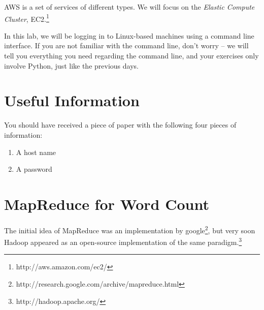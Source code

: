 AWS is a set of services of different types. We will focus on the \emph{Elastic
Compute Cluster}, EC2.\footnote{http://aws.amazon.com/ec2/}

In this lab, we will be logging in to Linux-based machines using a command line
interface. If you are not familiar with the command line, don't worry -- we
will tell you everything you need regarding the command line, and your
exercises only involve Python, just like the previous days.

\section{Useful Information}

You should have received a piece of paper with the following four pieces of
information:

\begin{enumerate}
\item A host name
\item A password
\end{enumerate}

%
%
%
%

\section{MapReduce for Word Count}

The initial idea of MapReduce was an implementation by
google\footnote{http://research.google.com/archive/mapreduce.html}, but very
soon Hadoop appeared as an open-source implementation of the same
paradigm.\footnote{http://hadoop.apache.org/}

